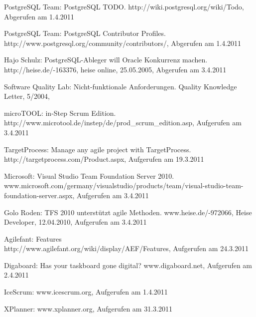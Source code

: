 \documentclass[german,english]{header}
\begin{document}
\begin{thebibliography}{5}
PostgreSQL Team:
PostgreSQL TODO.
http://wiki.postgresql.org/wiki/Todo, Abgerufen am 1.4.2011

PostgreSQL Team:
PostgreSQL Contributor Profiles.\\
http://www.postgresql.org/community/contributors/, Abgerufen am 1.4.2011

Hajo Schulz:
PostgreSQL-Ableger will Oracle Konkurrenz machen.\\
http://heise.de/-163376, heise online, 25.05.2005, Abgerufen am 3.4.2011

Software Quality Lab:
Nicht-funktionale Anforderungen.
Quality Knowledge Letter, 5/2004, 

microTOOL:
in-Step Scrum Edition.\\
http://www.microtool.de/instep/de/prod\_scrum\_edition.asp,
Aufgerufen am 3.4.2011

TargetProcess: Manage any agile project with TargetProcess.\\
http://targetprocess.com/Product.aspx,
Aufgerufen am 19.3.2011

Microsoft:
Visual Studio Team Foundation Server 2010.
www.microsoft.com/germany/visualstudio/products/team/visual-studio-team-foundation-server.aspx,
Aufgerufen am 3.4.2011

Golo Roden: 
TFS 2010 unterstützt agile Methoden.
www.heise.de/-972066,
Heise Developer, 12.04.2010, Aufgerufen am 3.4.2011

Agilefant: Features\\ 
http://www.agilefant.org/wiki/display/AEF/Features,
Aufgerufen am 24.3.2011

Digaboard: Has your taskboard gone digital?
www.digaboard.net,
Aufgerufen am 2.4.2011

IceScrum:
www.icescrum.org,
Aufgerufen am 1.4.2011

XPlanner:
www.xplanner.org,
Aufgerufen am 31.3.2011
\end{thebibliography}
\end{document}
